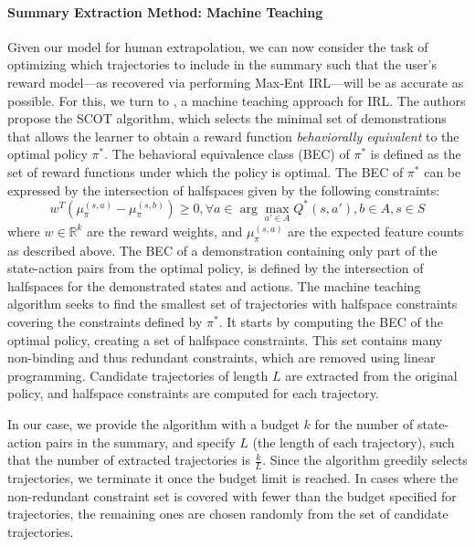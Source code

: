 \documentclass{article}
\begin{document}
\paragraph{Summary Extraction Method: Machine Teaching}
Given our model for human extrapolation, we can now consider the task of optimizing which trajectories to include in the summary such that the user's reward model---as recovered via performing Max-Ent IRL---will be as accurate as possible. For this, we turn to \cite{brown2018machineteachingirl}, a machine teaching approach for IRL. The authors propose the SCOT algorithm, which selects the minimal set of demonstrations that allows the learner to obtain a reward function \textit{behaviorally equivalent} to the optimal policy $\pi^*$. The behavioral equivalence class (BEC) of $\pi^*$ is defined as the set of reward functions under which the policy is optimal. The BEC of $\pi^*$ can be expressed by the intersection of halfspaces given by the following constraints:
\begin{equation}\label{eq_BEC}
   w^T(\mu_\pi^{(s,a)} - \mu_\pi^{(s,b)}) \geq 0,   
   \forall a \in \arg\max_{a'\in A}
   Q^*(s,a'),b \in A, s \in S
\end{equation}
where $w\in\mathbb{R}^k$ are the reward weights, and $\mu_\pi^{(s,a)}$ are the expected feature counts as described above. The BEC of a demonstration containing only part of the state-action pairs from the optimal policy, is defined by the intersection of halfspaces for the demonstrated states and actions. 
The machine teaching algorithm seeks to find the smallest set of trajectories with halfspace constraints covering the constraints defined by $\pi^*$. It starts by computing the BEC of the optimal policy, creating a set of halfspace constraints. This set contains many non-binding and thus redundant constraints, which are removed using linear programming. Candidate trajectories of length $L$ are extracted from the original policy, and halfspace constraints are computed for each trajectory.

In our case, we provide the algorithm with a budget $k$ for the number of state-action pairs in the summary, and specify $L$ (the length of each trajectory), such that the number of extracted trajectories is $\frac{k}{L}$. Since the algorithm greedily selects trajectories, we terminate it once the budget limit is reached. In cases where the non-redundant constraint set is covered with fewer than the budget specified for trajectories, the remaining ones are chosen randomly from the set of candidate trajectories.
\end{document}
